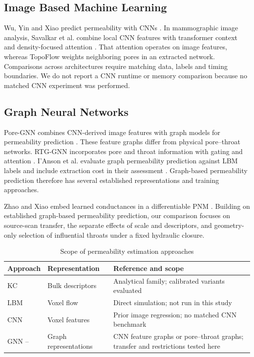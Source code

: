 \documentclass[a4paper]{svproc}
\begin{document}
\subsection{Image Based Machine Learning}

Wu, Yin and Xiao predict permeability with CNNs \cite{r3}. In mammographic image analysis, Savalkar et al. combine local CNN features with transformer context and density-focused attention \cite{r7}. That attention operates on image features, whereas TopoFlow weights neighboring pores in an extracted network. Comparisons across architectures require matching data, labels and timing boundaries. We do not report a CNN runtime or memory comparison because no matched CNN experiment was performed.

\subsection{Graph Neural Networks}

Pore-GNN combines CNN-derived image features with graph models for permeability prediction \cite{r8}. These feature graphs differ from physical pore--throat networks. RTG-GNN incorporates pore and throat information with gating and attention \cite{r9}. I'Anson et al. evaluate graph permeability prediction against LBM labels and include extraction cost in their assessment \cite{r10}. Graph-based permeability prediction therefore has several established representations and training approaches.

Zhao and Xiao embed learned conductances in a differentiable PNM \cite{r11}. Building on established graph-based permeability prediction, our comparison focuses on source-scan transfer, the separate effects of scale and descriptors, and geometry-only selection of influential throats under a fixed hydraulic closure.

\begin{table}[!htbp]
\caption{Scope of permeability estimation approaches}
\label{tab:1}
\centering\small
\setlength{\tabcolsep}{4pt}
\renewcommand{\arraystretch}{1.18}
\begin{tabularx}{\linewidth}{@{}>{\RaggedRight\arraybackslash}p{.18\linewidth}>{\RaggedRight\arraybackslash}p{.25\linewidth}>{\RaggedRight\arraybackslash}X@{}}
\toprule
\textbf{Approach} & \textbf{Representation} & \textbf{Reference and scope} \\
\midrule
KC \cite{r5} & Bulk descriptors & Analytical family; calibrated variants evaluated \\
LBM & Voxel flow & Direct simulation; not run in this study \\
CNN \cite{r3} & Voxel features & Prior image regression; no matched CNN benchmark \\
GNN \cite{r8}--\cite{r11} & Graph representations & CNN feature graphs or pore--throat graphs; transfer and restrictions tested here \\
\bottomrule
\end{tabularx}
\end{table}
\end{document}
